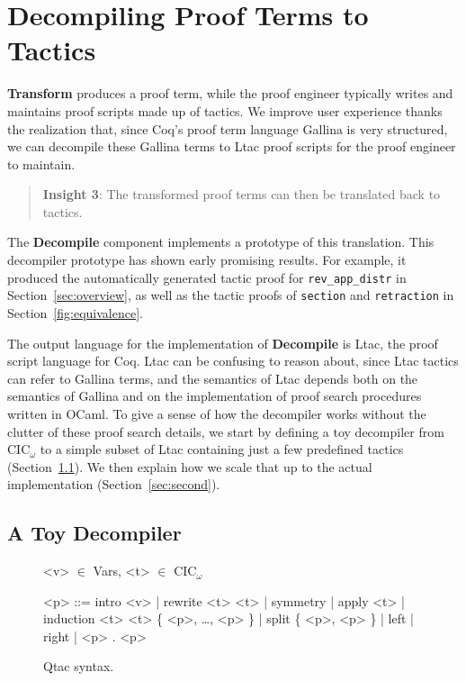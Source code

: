 \section{Decompiling Proof Terms to Tactics}
\label{sec:decompiler}

\textbf{Transform} produces a proof term,
while the proof engineer typically writes and maintains proof scripts made up of tactics.
We improve user experience thanks the realization that, since Coq's proof term language Gallina is very structured,
we can decompile these Gallina terms to Ltac proof scripts for the proof engineer to maintain.

\begin{quote}
\textbf{Insight 3}: The transformed proof terms can then be translated back to tactics.
\end{quote}

The \textbf{Decompile} component implements a prototype of this translation.
This decompiler prototype has shown early promising results.
For example, it produced the automatically generated tactic proof for \lstinline{rev_app_distr} 
in Section~\ref{sec:overview}, as well as the tactic proofs of \lstinline{section}
and \lstinline{retraction} in Section~\ref{fig:equivalence}.

The output language for the implementation of \textbf{Decompile} is Ltac, the proof script language for Coq.
Ltac can be confusing to reason about, since Ltac tactics can refer to Gallina terms, and the semantics of Ltac depends both on the
semantics of Gallina and on the implementation of proof search procedures written in OCaml.
To give a sense of how the decompiler works without the clutter of these proof search details, we start by defining a toy
decompiler from CIC$_{\omega}$ to a simple subset of Ltac containing just a few predefined tactics (Section~\ref{sec:first}).
We then explain how we scale that up to the actual implementation (Section~\ref{sec:second}).

\subsection{A Toy Decompiler}
\label{sec:first}

\begin{figure}
\small
\begin{grammar}
<v> $\in$ Vars, <t> $\in$ CIC$_{\omega}$

<p> ::= intro <v> |  rewrite <t> <t> | symmetry | apply <t> | induction <t> <t> \{ <p>, \ldots, <p> \} | split \{ <p>, <p> \} | left | right | <p> . <p>
\end{grammar}
\caption{Qtac syntax.}
\label{fig:ltacsyntax1}
\end{figure}

